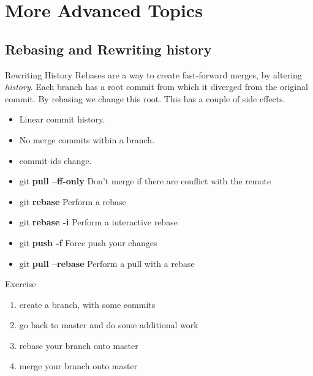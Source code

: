 \documentclass{beamer}
\begin{document}
\section{More Advanced Topics}
\subsection{Rebasing and Rewriting history}
\begin{frame}[fragile]{Rewriting History}
  Rebases are a way to create fast-forward merges, by altering \emph{history}. Each branch has a root commit from which it diverged from the original commit. By rebasing we change this root. This has a couple of side effects. 
  \begin{itemize}
    \item Linear commit history.
    \item No merge commits within a branch.
    \item commit-ids change.
  \end{itemize}

  \begin{block}{}
    \begin{itemize}
      \item git \textbf{pull --ff-only} Don't merge if there are conflict with the remote
      \item git \textbf{rebase} Perform a rebase
      \item git \textbf{rebase -i} Perform a interactive rebase
      \item git \textbf{push -f} Force push your changes
      \item git \textbf{pull --rebase} Perform a pull with a rebase
    \end{itemize}
  \end{block}
\end{frame}

\begin{frame}
  \begin{block}{Exercise}
    \begin{enumerate}
      \item create a branch, with some commits
      \item go back to master and do some additional work
      \item rebase your branch onto master
      \item merge your branch onto master
    \end{enumerate}
  \end{block}
\end{frame}
\end{document}
